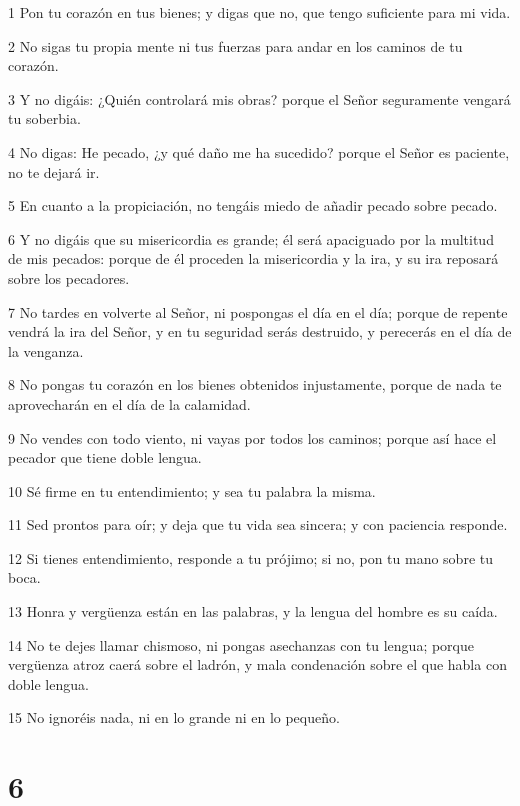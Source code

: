 \par 1 Pon tu corazón en tus bienes; y digas que no, que tengo suficiente para mi vida.
\par 2 No sigas tu propia mente ni tus fuerzas para andar en los caminos de tu corazón.
\par 3 Y no digáis: ¿Quién controlará mis obras? porque el Señor seguramente vengará tu soberbia.
\par 4 No digas: He pecado, ¿y qué daño me ha sucedido? porque el Señor es paciente, no te dejará ir.
\par 5 En cuanto a la propiciación, no tengáis miedo de añadir pecado sobre pecado.
\par 6 Y no digáis que su misericordia es grande; él será apaciguado por la multitud de mis pecados: porque de él proceden la misericordia y la ira, y su ira reposará sobre los pecadores.
\par 7 No tardes en volverte al Señor, ni pospongas el día en el día; porque de repente vendrá la ira del Señor, y en tu seguridad serás destruido, y perecerás en el día de la venganza.
\par 8 No pongas tu corazón en los bienes obtenidos injustamente, porque de nada te aprovecharán en el día de la calamidad.
\par 9 No vendes con todo viento, ni vayas por todos los caminos; porque así hace el pecador que tiene doble lengua.
\par 10 Sé firme en tu entendimiento; y sea tu palabra la misma.
\par 11 Sed prontos para oír; y deja que tu vida sea sincera; y con paciencia responde.
\par 12 Si tienes entendimiento, responde a tu prójimo; si no, pon tu mano sobre tu boca.
\par 13 Honra y vergüenza están en las palabras, y la lengua del hombre es su caída.
\par 14 No te dejes llamar chismoso, ni pongas asechanzas con tu lengua; porque vergüenza atroz caerá sobre el ladrón, y mala condenación sobre el que habla con doble lengua.
\par 15 No ignoréis nada, ni en lo grande ni en lo pequeño.

\chapter{6}

